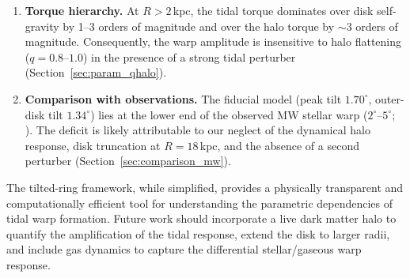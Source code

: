\begin{enumerate}
    \item \textbf{Torque hierarchy.} At $R>2$\,kpc, the tidal torque dominates over disk self-gravity by 1--3 orders of magnitude and over the halo torque by ${\sim}3$ orders of magnitude. Consequently, the warp amplitude is insensitive to halo flattening ($q=0.8$--$1.0$) in the presence of a strong tidal perturber (Section~\ref{sec:param_qhalo}).
    
    \item \textbf{Comparison with observations.} The fiducial model (peak tilt $1.70^\circ$, outer-disk tilt $1.34^\circ$) lies at the lower end of the observed MW stellar warp ($2^\circ$--$5^\circ$; \citealt{chen2019, skowron2019}). The deficit is likely attributable to our neglect of the dynamical halo response, disk truncation at $R=18$\,kpc, and the absence of a second perturber (Section~\ref{sec:comparison_mw}).
\end{enumerate}

The tilted-ring framework, while simplified, provides a physically transparent and computationally efficient tool for understanding the parametric dependencies of tidal warp formation. Future work should incorporate a live dark matter halo to quantify the amplification of the tidal response, extend the disk to larger radii, and include gas dynamics to capture the differential stellar/gaseous warp response.
